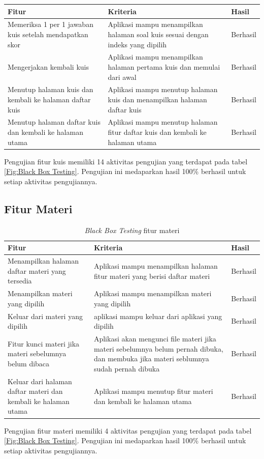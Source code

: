 \begin{table}[H]
	\begin{tabular}{|p{}|p{}|p{}|}
		\hline
		 \centering\textbf{Fitur} & \multicolumn{1}{m{0.45\textwidth}|}{\centering \textbf{Kriteria}}&  \multicolumn{1}{m{0.1\textwidth}|}{\centering \textbf{Hasil}}\\
		 \hline
		Memeriksa 1 per 1 jawaban kuis setelah mendapatkan skor
		& Aplikasi mampu menampilkan halaman soal kuis sesuai dengan indeks yang dipilih 
		& Berhasil\\
		\hline
		Mengerjakan kembali kuis
		& Aplikasi mampu menampilkan halaman pertama kuis dan memulai dari awal
		& Berhasil\\
		\hline
		Menutup halaman kuis dan kembali ke halaman daftar kuis
		& Aplikasi mampu menutup halaman kuis dan menampilkan halaman daftar kuis
		& Berhasil\\
		\hline
		Menutup halaman daftar kuis dan kembali ke halaman utama
		& Aplikasi mampu menutup halaman fitur daftar kuis dan kembali ke halaman utama 
		& Berhasil\\
		\hline
	\end{tabular}
\end{table}
Pengujian fitur kuis memiliki 14 aktivitas pengujian yang terdapat pada tabel \ref*{Fig:Black Box Testing}.
Pengujian ini medaparkan hasil 100\% berhasil untuk setiap aktivitas pengujiannya.
\subsection{Fitur Materi}
\begin{table}[H]
	\centering
	\caption{\textit{Black Box Testing} fitur materi}
	\label{Tab:blackBoxMateri}
	\begin{tabular}{|p{}|p{}|p{}|}
		\hline
		 \centering\textbf{Fitur} & \multicolumn{1}{m{0.45\textwidth}|}{\centering \textbf{Kriteria}}&  \multicolumn{1}{m{0.1\textwidth}|}{\centering \textbf{Hasil}}\\
		\hline
		Menampilkan halaman daftar materi yang tersedia
		& Aplikasi mampu menampilkan halaman fitur materi yang berisi daftar materi
		& Berhasil\\
		\hline
		Menampilkan materi yang dipilih
		& Aplikasi mampu menampilkan materi yang dipilih
		& Berhasil\\
		\hline
		Keluar dari materi yang dipilih
		& aplikasi mampu keluar dari aplikasi yang dipilih
		& Berhasil\\
		\hline
		Fitur kunci materi jika materi sebelumnya belum dibaca
		& Aplikasi akan mengunci file materi jika materi sebelumnya belum pernah dibuka, dan membuka jika materi seblumnya sudah pernah dibuka
		& Berhasil\\
		\hline
		Keluar dari halaman daftar materi dan kembali ke halaman utama
		& Aplikasi mampu menutup fitur materi dan kembali ke halaman utama
		& Berhasil\\
		\hline
	\end{tabular}
\end{table}
Pengujian fitur materi memiliki 4 aktivitas pengujian yang terdapat pada tabel \ref*{Fig:Black Box Testing}.
Pengujian ini medaparkan hasil 100\% berhasil untuk setiap aktivitas pengujiannya.
